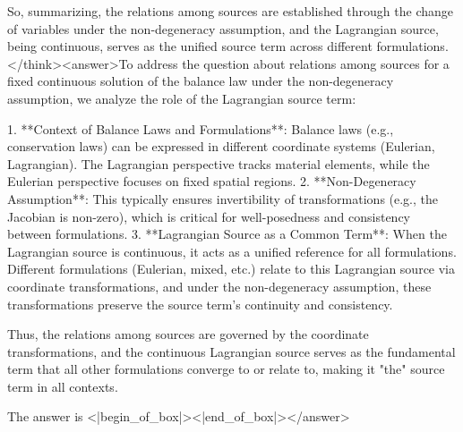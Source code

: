 So, summarizing, the relations among sources are established through the change of variables under the non-degeneracy assumption, and the Lagrangian source, being continuous, serves as the unified source term across different formulations.</think><answer>To address the question about relations among sources for a fixed continuous solution of the balance law under the non-degeneracy assumption, we analyze the role of the Lagrangian source term:  

1. **Context of Balance Laws and Formulations**: Balance laws (e.g., conservation laws) can be expressed in different coordinate systems (Eulerian, Lagrangian). The Lagrangian perspective tracks material elements, while the Eulerian perspective focuses on fixed spatial regions.  
2. **Non-Degeneracy Assumption**: This typically ensures invertibility of transformations (e.g., the Jacobian is non-zero), which is critical for well-posedness and consistency between formulations.  
3. **Lagrangian Source as a Common Term**: When the Lagrangian source is continuous, it acts as a unified reference for all formulations. Different formulations (Eulerian, mixed, etc.) relate to this Lagrangian source via coordinate transformations, and under the non-degeneracy assumption, these transformations preserve the source term’s continuity and consistency.  

Thus, the relations among sources are governed by the coordinate transformations, and the continuous Lagrangian source serves as the fundamental term that all other formulations converge to or relate to, making it "the" source term in all contexts.  

The answer is <|begin_of_box|><|end_of_box|></answer>